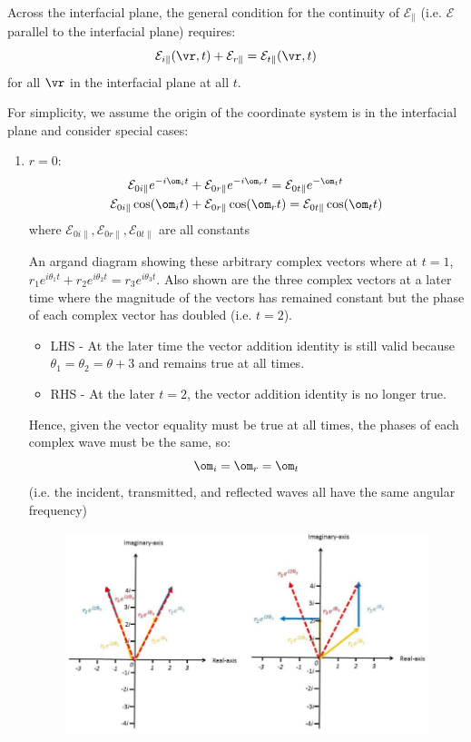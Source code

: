 \documentclass[a4paper, 11pt, normalem]{report}
\renewcommand\E{\mathcal{E}}
\begin{document}
Across the interfacial plane, the general condition for the continuity of $\E_{\parallel}$ (i.e. $\E$ parallel to the interfacial plane) requires:
\begin{equation}
	\E_{i\parallel} (\vr,t) + \E_{r\parallel} = \E_{t\parallel}(\vr,t)
\end{equation}
for all $\vr$ in the interfacial plane at all $t$.

For simplicity, we assume the origin of the coordinate system is in the interfacial plane and consider special cases:
\begin{enumerate}
	\item $r=0$:
	\begin{align}
		\E_{0i\parallel}e^{-i\om_it} &+ \E_{0r\parallel}e^{-i\om_rt} = \E_{0t\parallel}e^{-\om_tt} \\
		\E_{0i\parallel}\cos(\om_it) &+ \E_{0r\parallel}\cos(\om_rt) = \E_{0t\parallel}\cos(\om_tt)
	\end{align}
	where $\E_{0i\parallel},\E_{0r\parallel},\E_{0t\parallel}$ are all constants

	An argand diagram showing these arbitrary complex vectors where at $t=1$, $r_1e^{i\theta_1t} + r_2e^{i\theta_2t} = r_3e^{i\theta_3t}$.
	Also shown are the three complex vectors at a later time where the magnitude of the vectors has remained constant but the phase of each complex vector has doubled (i.e. $t=2$).
	\begin{itemize}
		\item LHS - At the later time the vector addition identity is still valid because $\theta_1 = \theta_2 = \theta+3$ and remains true at all times.
		\item RHS - At the later $t=2$, the vector addition identity is no longer true.
	\end{itemize}
	Hence, given the vector equality must be true at all times, the phases of each complex wave must be the same, so:
	\begin{equation}
		\om_i = \om_r = \om_t
	\end{equation}
	(i.e. the incident, transmitted, and reflected waves all have the same angular frequency)

	\begin{figure}[H]
		\centering
		\includegraphics[scale=0.4]{argand.png}
	\end{figure}


\end{enumerate}
\end{document}
